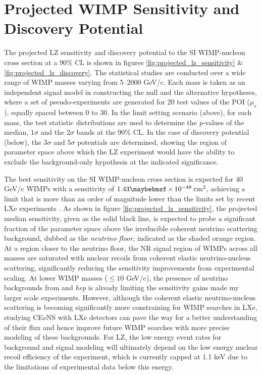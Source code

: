 {%
\section{Projected WIMP Sensitivity and Discovery Potential}
\label{sec:lz_sensitivity}

The projected LZ sensitivity and discovery potential to the SI WIMP-nucleon cross section at a 90\% CL is shown in figures \ref{fig:projected_lz_sensitivity} \& \ref{fig:projected_lz_discovery}. The statistical studies are conducted over a wide range of WIMP masses varying from 5--2000 GeV/c\squared{}. Each mass is taken as an independent signal model in constructing the null and the alternative hypotheses, where a set of pseudo-experiments are generated for 20 test values of the POI ($\mu_{s}$), equally spaced between 0 to 30. In the limit setting scenario (above), for each mass, the test statistic distributions are used to determine the \textit{p}-values of the median, $1\sigma$ and the $2\sigma$ bands at the 90\% CL. In the case of discovery potential (below), the $3\sigma$ and $5\sigma$ potentials are determined, showing the region of parameter space above which the LZ experiment would have the ability to exclude the background-only hypothesis at the indicated significance.

The best sensitivity on the SI WIMP-nucleon cross section is expected for 40 GeV/c\squared{} WIMPs with a sensitivity of $1.43 \times 10^{-48} \; \MathText{cm}^2$, achieving a limit that is more than an order of magnitude lower than the limits set by recent LXe experiments \cite{lux_full, xenon_1t, pandax_limit}. As shown in figure \ref{fig:projected_lz_sensitivity}, the projected median sensitivity, given as the solid black line, is expected to probe a significant fraction of the parameter space above the irreducible coherent neutrino scattering background, dubbed as the \textit{neutrino floor}, indicated as the shaded orange region. At a region closer to the neutrino floor, the NR signal region of WIMPs across all masses are saturated with nuclear recoils from coherent elastic neutrino-nucleus scattering, significantly reducing the sensitivity improvements from experimental scaling. At lower WIMP masses ($\leqslant10$ GeV/c\squared{}), the presence of neutrino backgrounds from \BE{} and \textit{hep} is already limiting the sensitivity gains made my larger scale experiments. However, although the coherent elastic neutrino-nucleus scattering is becoming significantly more constraining for WIMP searches in LXe, studying CE$\nu$NS with LXe detectors can pave the way for a better understanding of their flux and hence improve future WIMP searches with more precise modeling of these backgrounds. For LZ, the low energy event rates for background and signal modeling will ultimately depend on the low energy nuclear recoil efficiency of the experiment, which is currently capped at 1.1 keV due to the limitations of experimental data below this energy.  

}
